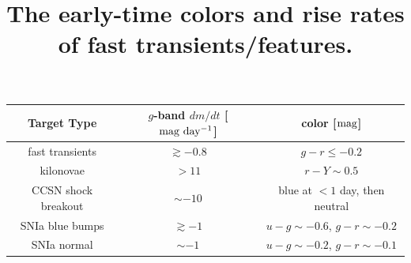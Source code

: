 \documentclass[12pt, letterpaper]{article}
\begin{document}



\clearpage

\begin{footnotesize}
\begin{center}
\title{The early-time colors and rise rates of fast transients/features.}\label{tab:1}
\begin{tabular}{|c|c|c|} 
\hline
Target Type         & $g$-band $dm/dt$ [$\rm mag\ day^{-1}$] & color [$\rm mag$] \\
\hline 
fast transients     & $\gtrsim-0.8$ & $g-r\leq-0.2$  \\ 
kilonovae           & $>11$          & $r-Y\sim0.5$  \\ 
CCSN shock breakout & $\sim-10$     & blue at $<1$ day, then neutral  \\ 
SNIa blue bumps     & $\gtrsim -1$  & $u-g\sim-0.6$, $g-r\sim-0.2$  \\ 
SNIa normal         & $\sim -1$     & $u-g\sim-0.2$, $g-r\sim-0.1$  \\
\hline
\end{tabular}
\end{center}
\end{footnotesize}
\end{document}

